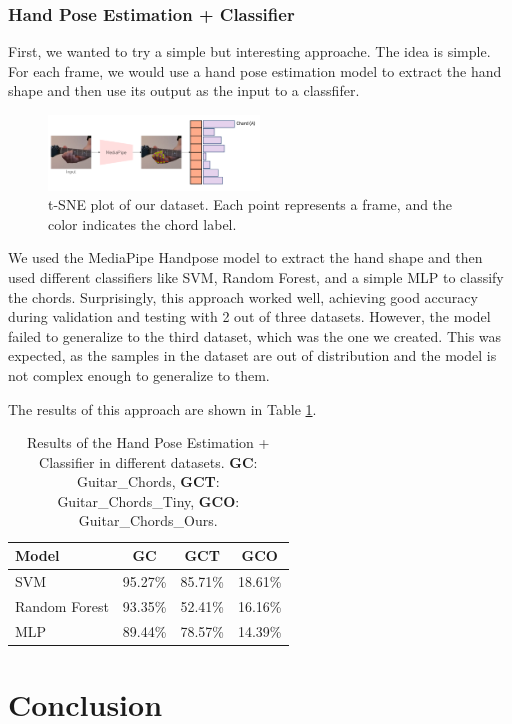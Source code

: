 \documentclass[10pt,twocolumn,letterpaper]{article}
\begin{document}
\subsubsection{Hand Pose Estimation + Classifier}
First, we wanted to try a simple but interesting approache. The idea is simple. For each frame, we would use a hand pose estimation model to extract the hand shape and then use its output as the input to a classfifer. 

\begin{figure}[h]
  \centering
  \includegraphics[width=0.5\textwidth]{images/final/hand_pose_estimation_classifier.png}
  \caption{t-SNE plot of our dataset. Each point represents a frame, and the color indicates the chord label. }
  \label{fig:ours-tsne-plot}
\end{figure}

We used the MediaPipe Handpose model \cite{} to extract the hand shape and then used different classifiers like SVM, Random Forest, and a simple MLP to classify the chords. Surprisingly, this approach worked well, achieving good accuracy during validation and testing with 2 out of three datasets. However, the model failed to generalize to the third dataset, which was the one we created. This was expected, as the samples in the dataset are out of distribution and the model is not complex enough to generalize to them. 

The results of this approach are shown in Table \ref{tab:handpose-classifier-results}.

\begin{table}[h]
  \centering
  \begin{tabular}{lccc}
    \toprule
    \textbf{Model} & \textbf{GC} & \textbf{GCT} & \textbf{GCO} \\
    \midrule
    SVM & 95.27\% & 85.71\% & 18.61\% \\
    Random Forest & 93.35\% & 52.41\% & 16.16\%  \\
    MLP & 89.44\% & 78.57\% & 14.39\% \\
    \bottomrule
  \end{tabular}
  \caption{Results of the Hand Pose Estimation + Classifier in different datasets. \textbf{GC}: Guitar\_Chords, \textbf{GCT}: Guitar\_Chords\_Tiny, \textbf{GCO}: Guitar\_Chords\_Ours.}
  \label{tab:handpose-classifier-results}
\end{table}

\section{Conclusion}

 {\small
  
  
 }
\end{document}

